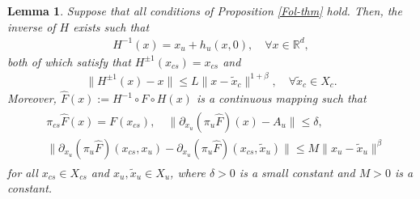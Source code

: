 \documentclass[10pt,a4paper]{amsart}
\newtheorem{lemma}{Lemma}
\begin{document}
\begin{lemma}\label{dec-lem}
Suppose that all conditions of Proposition {\rm \ref{Fol-thm}} hold. Then, the inverse of $H$ exists such that
\begin{align}\label{Dec-2}
H^{-1}(x)=x_u+h_u(x,0), \quad \forall x\in\mathbb{R}^d,
\end{align}
both of which satisfy that $H^{\pm 1}(x_{cs})=x_{cs}$ and
\begin{align}\label{Dif-3}
\|H^{\pm 1}(x)-x\|\le L\|x-\tilde{x}_c\|^{1+\beta},\quad \forall \tilde{x}_c\in X_c.
\end{align}
Moreover,
$
\hat{F}(x):=H^{-1} \circ F \circ H(x)
$
is a continuous mapping such that
\begin{align}\label{xu-F}
\begin{split}
&\pi_{cs} \hat{F}(x)=F(x_{cs}),\quad \|\partial_{x_u}(\pi_u\hat{F})(x)-A_u\|\le \delta,
\\
&\|\partial_{x_u}(\pi_u\hat{F})(x_{cs},x_u)-\partial_{x_u}(\pi_u\hat{F})(x_{cs},\tilde x_u)\|\le M\|x_u-\tilde x_u\|^\beta %
\end{split}
\end{align}
for all $x_{cs}\in X_{cs}$ and $x_u,\tilde x_u\in X_u$,
where $\delta>0$ is a small constant and $M>0$ is a constant.
\end{lemma}
\end{document}
